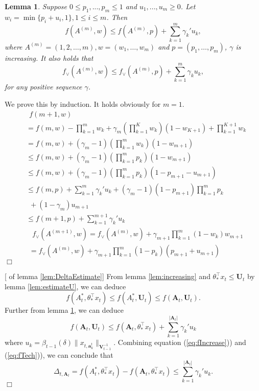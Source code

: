 \documentclass{article}
\newcommand{\bA}{\mathbf{A}}
\newcommand{\ba}{\mathbf{a}}
\newcommand{\bU}{\mathbf{U}}
\newcommand{\bV}{\mathbf{V}}
\newcommand{\abs}[1]{\left| #1 \right|}
\newcommand{\norm}[1]{\| #1 \|}
\newtheorem{lemma}[theorem]{Lemma}%
\newenvironment{proof}{\noindent {\textbf{Proof. }}}{$\Box$ \medskip}
\begin{document}
\begin{lemma}
\label{lem:estimateTech}
Suppose $0 \leq p_1,...,p_m \leq 1$ and $u_1,...,u_m \geq 0$. Let $w_i = \min\{p_i + u_i, 1\}, 1 \leq i \leq m$. Then
$$
f(A^{(m)}, w) \leq f(A^{(m)}, p) + \sum_{k=1}^{m} \gamma_k' u_k,
$$
where $A^{(m)} = (1,2,\ldots,m), w = (w_1, \ldots, w_m)$ and $p = (p_1, \ldots, p_m)$, $\gamma$ is increasing. It also holds that
$$
f_{\vee}(A^{(m)}, w) \leq f_{\vee}(A^{(m)}, p) + \sum_{k=1}^m \gamma_k u_k,
$$
for any positive sequence $\gamma$.
\end{lemma}
\begin{proof}
We prove this by induction. It holds obviously for $m=1$.
\begin{align*}
&~~f(m+1, w)\\
&= f(m, w) -\prod_{k=1}^{m} w_k + \gamma_{m}  (\prod_{k=1}^{K} w_k) (1 - w_{K+1})+ \prod_{k=1}^{K+1} w_k\\
&= f(m, w) + (\gamma_{m} - 1) (\prod_{k=1}^{m} w_k) (1 - w_{m+1})\\
&\leq f(m, w) + (\gamma_{m} - 1) (\prod_{k=1}^{m} p_k) (1 - w_{m+1})\\
&\leq f(m, w) + (\gamma_{m} - 1) (\prod_{k=1}^{m} p_k)  (1 - p_{m+1} - u_{m+1})\\
&\leq f(m, p) +  \sum_{k=1}^{m} \gamma_k' u_k + (\gamma_{m} - 1) (1 - p_{m+1}) \prod_{k=1}^{m} p_k\\
&~~ + (1 - \gamma_{m}) u_{m+1}\\
&\leq f(m+1, p) + \sum_{k=1}^{m+1} \gamma_k' u_k
\end{align*}
\begin{align*}
&~~f_{\vee}(A^{(m+1)}, w) = f_{\vee}(A^{(m)}, w) + \gamma_{m+1}\prod_{k=1}^m(1 - w_k) w_{m+1}\\
&= f_{\vee}(A^{(m)}, w) +  \gamma_{m+1} \prod_{k=1}^m(1 - p_k) (p_{m+1} + u_{m+1})
\end{align*}
\end{proof}

\begin{proof}[ of lemma \ref{lem:DeltaEstimate}]
From lemma \ref{lem:increasing} and $\theta_*^{\top}x_t \leq \bU_t$ by lemma \ref{lem:estimateU}, we can deduce 
\begin{equation}
\label{eq:fIncrease}
f(A_t^*, \theta_*^{\top}x_t) \leq f(A_t^*, \bU_t) \leq f(\bA_t, \bU_t).
\end{equation}
Further from lemma \ref{lem:estimateTech}, we can deduce
\begin{equation}
\label{eq:fTech}
f(\bA_t, \bU_t) \leq f(\bA_t, \theta_*^{\top}x_t) + \sum_{k=1}^{\abs{\bA_t}} \gamma_k' u_k
\end{equation}
where $u_k = \beta_{t-1}(\delta)\norm{x_{t, \ba_k^t}}_{\bV_{t-1}^{-1}}$. Combining equation (\ref{eq:fIncrease})) and (\ref{eq:fTech})), we can conclude that
$$
\Delta_{t, \bA_t} = f(A_t^*, \theta_*^{\top}x_t) - f(\bA_t, \theta_*^{\top}x_t) \leq \sum_{k=1}^{\abs{\bA_t}} \gamma_k' u_k.
$$
\end{proof}
\end{document}
